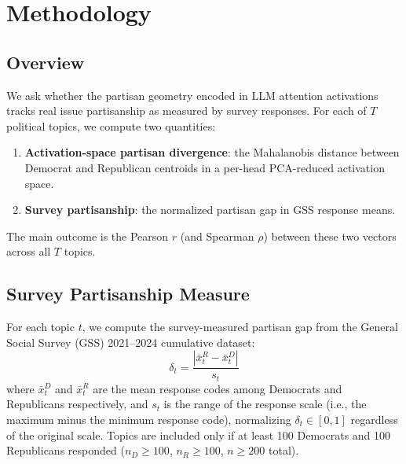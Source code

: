 \section{Methodology}
\label{sec:methods}

\subsection{Overview}

We ask whether the partisan geometry encoded in LLM attention activations tracks real issue partisanship as measured by survey responses. For each of $T$ political topics, we compute two quantities:
\begin{enumerate}
    \item \textbf{Activation-space partisan divergence}: the Mahalanobis distance between Democrat and Republican centroids in a per-head PCA-reduced activation space.
    \item \textbf{Survey partisanship}: the normalized partisan gap in GSS response means.
\end{enumerate}
The main outcome is the Pearson $r$ (and Spearman $\rho$) between these two vectors across all $T$ topics.

\subsection{Survey Partisanship Measure}
\label{sec:gss}

For each topic $t$, we compute the survey-measured partisan gap from the General Social Survey (GSS) 2021--2024 cumulative dataset:
\begin{equation}
    \delta_t = \frac{|\bar{x}^R_t - \bar{x}^D_t|}{s_t}
    \label{eq:gss_pol}
\end{equation}
where $\bar{x}^D_t$ and $\bar{x}^R_t$ are the mean response codes among Democrats and Republicans respectively, and $s_t$ is the range of the response scale (i.e., the maximum minus the minimum response code), normalizing $\delta_t \in [0,1]$ regardless of the original scale. Topics are included only if at least 100 Democrats and 100 Republicans responded ($n_D \geq 100$, $n_R \geq 100$, $n \geq 200$ total).

